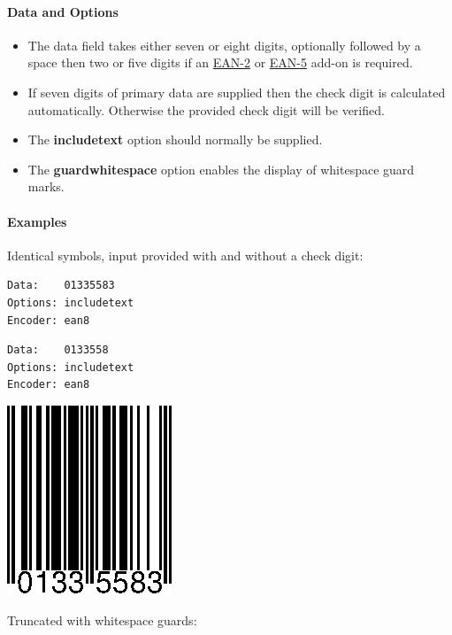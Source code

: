 \hypertarget{data-and-options-1}{%
\paragraph{Data and Options}\label{data-and-options-1}}

\begin{itemize}
\tightlist
\item
  The data field takes either seven or eight digits, optionally followed
  by a space then two or five digits if an
  \protect\hyperlink{ean-2}{EAN-2} or \protect\hyperlink{ean-5}{EAN-5}
  add-on is required.
\item
  If seven digits of primary data are supplied then the check digit is
  calculated automatically. Otherwise the provided check digit will be
  verified.
\item
  The \textbf{includetext} option should normally be supplied.
\item
  The \textbf{guardwhitespace} option enables the display of whitespace
  guard marks.
\end{itemize}

\hypertarget{examples-1}{%
\paragraph{Examples}\label{examples-1}}

Identical symbols, input provided with and without a check digit:

\begin{verbatim}
Data:    01335583
Options: includetext
Encoder: ean8
\end{verbatim}

\begin{verbatim}
Data:    0133558
Options: includetext
Encoder: ean8
\end{verbatim}

\includegraphics{images/ean8-1.eps}

Truncated with whitespace guards:

